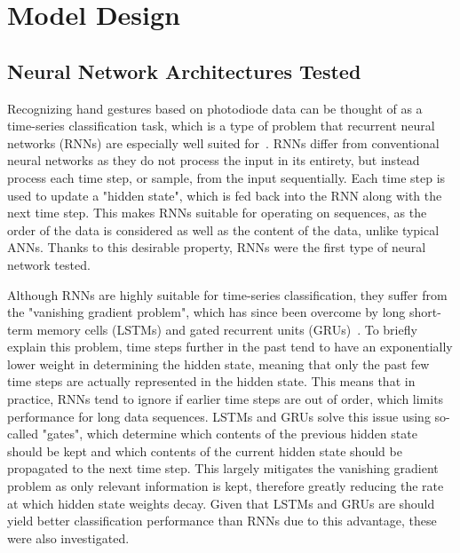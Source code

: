 \section{Model Design}\label{sec:model-design}
\subsection{Neural Network Architectures Tested}\label{subsec:architectures-tested}
Recognizing hand gestures based on photodiode data can be thought of as a time-series classification task, which is a type of problem that recurrent neural networks (RNNs) are especially well suited for~\cite{HUSKEN2003223}.
RNNs differ from conventional neural networks as they do not process the input in its entirety, but instead process each time step, or sample, from the input sequentially.
Each time step is used to update a "hidden state", which is fed back into the RNN along with the next time step.
This makes RNNs suitable for operating on sequences, as the order of the data is considered as well as the content of the data, unlike typical ANNs.
Thanks to this desirable property, RNNs were the first type of neural network tested.

Although RNNs are highly suitable for time-series classification, they suffer from the "vanishing gradient problem", which has since been overcome by long short-term memory cells (LSTMs) and gated recurrent units (GRUs)~\cite{DBLP:journals/corr/abs-1801-06105}.
To briefly explain this problem, time steps further in the past tend to have an exponentially lower weight in determining the hidden state, meaning that only the past few time steps are actually represented in the hidden state.
This means that in practice, RNNs tend to ignore if earlier time steps are out of order, which limits performance for long data sequences.
LSTMs and GRUs solve this issue using so-called "gates", which determine which contents of the previous hidden state should be kept and which contents of the current hidden state should be propagated to the next time step.
This largely mitigates the vanishing gradient problem as only relevant information is kept, therefore greatly reducing the rate at which hidden state weights decay.
Given that LSTMs and GRUs are should yield better classification performance than RNNs due to this advantage, these were also investigated.

